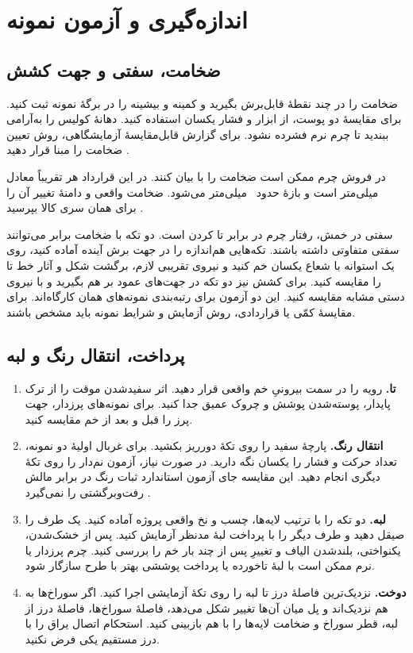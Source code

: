 \section{اندازه‌گیری و آزمون نمونه}

\subsection{ضخامت، سفتی و جهت کشش}

ضخامت را در چند نقطۀ قابل‌برش بگیرید و کمینه و بیشینه را در برگۀ نمونه ثبت کنید. برای مقایسۀ دو پوست، از ابزار و فشار یکسان استفاده کنید. دهانۀ کولیس را به‌آرامی ببندید تا چرم نرم فشرده نشود. برای گزارش قابل‌مقایسۀ آزمایشگاهی، روش تعیین ضخامت  را مبنا قرار دهید \cite{iso2589}.

در فروش چرم ممکن است ضخامت را با  بیان کنند. در این قرارداد هر  تقریباً معادل ~میلی‌متر است و بازۀ  حدود ~میلی‌متر می‌شود. ضخامت واقعی و دامنۀ تغییر آن را برای همان سری کالا بپرسید \cite{tandy}.

سفتی در خمش، رفتار چرم در برابر تا کردن است. دو تکه با ضخامت برابر می‌توانند سفتی متفاوتی داشته باشند. تکه‌هایی هم‌اندازه را در جهت برش آینده آماده کنید، روی یک استوانه با شعاع یکسان خم کنید و نیروی تقریبی لازم، برگشت شکل و آثار خط تا را مقایسه کنید. برای کشش نیز دو تکه در جهت‌های عمود بر هم بگیرید و با نیروی دستی مشابه مقایسه کنید. این دو آزمون برای رتبه‌بندی نمونه‌های همان کارگاه‌اند. برای مقایسۀ کمّی یا قراردادی، روش آزمایش و شرایط نمونه باید مشخص باشند.

\subsection{پرداخت، انتقال رنگ و لبه}

\begin{enumerate}
  \item \textbf{تا.} رویه را در سمت بیرونیِ خم واقعی قرار دهید. اثر سفیدشدن موقت را از ترک پایدار، پوسته‌شدن پوشش و چروک عمیق جدا کنید. برای نمونه‌های پرزدار، جهت پرز را قبل و بعد از خم مقایسه کنید.
  \item \textbf{انتقال رنگ.} پارچۀ سفید را روی تکۀ دورریز بکشید. برای غربال اولیۀ دو نمونه، تعداد حرکت و فشار را یکسان نگه دارید. در صورت نیاز، آزمون نم‌دار را روی تکۀ دیگری انجام دهید. این مقایسه جای آزمون استاندارد ثبات رنگ در برابر مالش رفت‌وبرگشتی را نمی‌گیرد \cite{iso11640}.
  \item \textbf{لبه.} دو تکه را با ترتیب لایه‌ها، چسب و نخ واقعی پروژه آماده کنید. یک طرف را صیقل دهید و طرف دیگر را با پرداخت لبۀ مدنظر آزمایش کنید. پس از خشک‌شدن، یکنواختی، بلندشدن الیاف و تغییرِ پس از چند بار خم را بررسی کنید. چرم پرزدار یا نرم ممکن است با لبۀ تاخورده یا پرداخت پوششی بهتر با طرح سازگار شود.
  \item \textbf{دوخت.} نزدیک‌ترین فاصلۀ درز تا لبه را روی تکۀ آزمایشی اجرا کنید. اگر سوراخ‌ها به هم نزدیک‌اند و پل میان آن‌ها تغییر شکل می‌دهد، فاصلۀ سوراخ‌ها، فاصلۀ درز از لبه، قطر سوراخ و ضخامت لایه‌ها را با هم بازبینی کنید. استحکام اتصال یراق را با درز مستقیم یکی فرض نکنید.
\end{enumerate}

